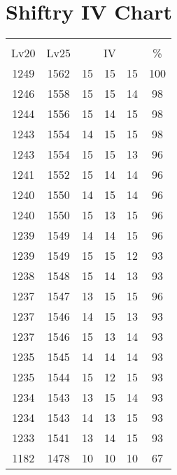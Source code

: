 \documentclass{article}%
\begin{document}
%
\normalsize%
\section{Shiftry IV Chart}%
\label{sec:Shiftry IV Chart}%
\renewcommand{\arraystretch}{1.5}%
\begin{tabular}{|c|c|c|c|c|c|}%
\hline%
\multicolumn{6}{|c|}{\textcolor{white}{ 
\linebreak{Shiftry}
}%
\cellcolor{black}}\\%
\multicolumn{1}{|c}{Lv20}&\multicolumn{1}{c|}{Lv25}&\multicolumn{3}{c|}{IV}&\multicolumn{1}{|c|}{\%}\\%
\hline%
\rowcolor{color100}%
1249&1562&15&15&15&100\\%
\hline%
\rowcolor{color98}%
1246&1558&15&15&14&98\\%
\hline%
\rowcolor{color98}%
1244&1556&15&14&15&98\\%
\hline%
\rowcolor{color98}%
1243&1554&14&15&15&98\\%
\hline%
\rowcolor{color96}%
1243&1554&15&15&13&96\\%
\hline%
\rowcolor{color96}%
1241&1552&15&14&14&96\\%
\hline%
\rowcolor{color96}%
1240&1550&14&15&14&96\\%
\hline%
\rowcolor{color96}%
1240&1550&15&13&15&96\\%
\hline%
\rowcolor{color96}%
1239&1549&14&14&15&96\\%
\hline%
\rowcolor{color93}%
1239&1549&15&15&12&93\\%
\hline%
\rowcolor{color93}%
1238&1548&15&14&13&93\\%
\hline%
\rowcolor{color96}%
1237&1547&13&15&15&96\\%
\hline%
\rowcolor{color93}%
1237&1546&14&15&13&93\\%
\hline%
\rowcolor{color93}%
1237&1546&15&13&14&93\\%
\hline%
\rowcolor{color93}%
1235&1545&14&14&14&93\\%
\hline%
\rowcolor{color93}%
1235&1544&15&12&15&93\\%
\hline%
\rowcolor{color93}%
1234&1543&13&15&14&93\\%
\hline%
\rowcolor{color93}%
1234&1543&14&13&15&93\\%
\hline%
\rowcolor{color93}%
1233&1541&13&14&15&93\\%
\hline%
\rowcolor{color91}%
1182&1478&10&10&10&67\\%
\end{tabular}

%
\end{document}
